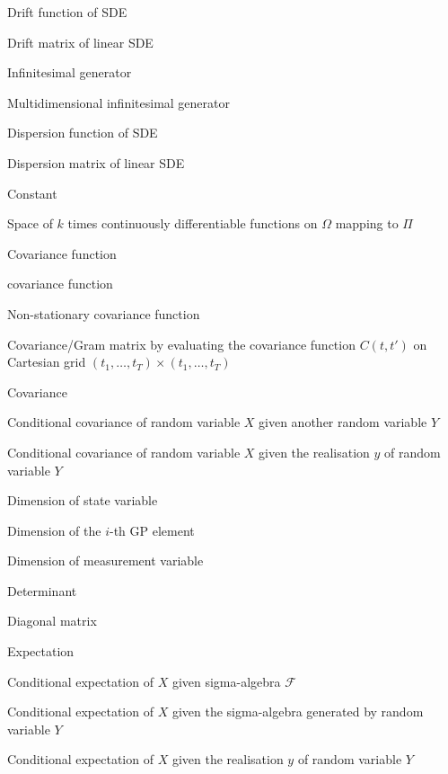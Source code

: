 \symbols

\begin{description}[style=multiline,leftmargin=3cm]
\item[$a$] Drift function of SDE
\item[$A$] Drift matrix of linear SDE
\item[$\A$] Infinitesimal generator
\item[$\Am$] Multidimensional infinitesimal generator
\item[$b$] Dispersion function of SDE
\item[$B$] Dispersion matrix of linear SDE
\item[$c$] Constant
\item[$\mathcal{C}^k(\Omega; \Pi)$] Space of $k$ times continuously differentiable functions on $\Omega$ mapping to $\Pi$
\item[$C(t,t')$] Covariance function
\item[$C_{\mathrm{Mat.}}(t,t')$] \matern covariance function
\item[$C_{\mathrm{NS}}(t,t')$] Non-stationary \matern covariance function
\item[$C_{1:T}$] Covariance/Gram matrix by evaluating the covariance function $C(t, t')$ on Cartesian grid $(t_1,\ldots, t_T) \times (t_1,\ldots, t_T)$
\item[$\covsym$] Covariance
\item[$\cov{X \mid Y}$] Conditional covariance of random variable $X$ given another random variable $Y$
\item[$\cov{X \mid y}$] Conditional covariance of random variable $X$ given the realisation $y$ of random variable $Y$
\item[$d$] Dimension of state variable
\item[$d_i$] Dimension of the $i$-th GP element
\item[$d_y$] Dimension of measurement variable
\item[$\det$] Determinant
\item[$\diagsym$] Diagonal matrix 
\item[$\expecsym$] Expectation
\item[$\expec{X \mid \mathcal{F}}$] Conditional expectation of $X$ given sigma-algebra $\mathcal{F}$
\item[$\expec{X \cond Y}$] Conditional expectation of $X$ given the sigma-algebra generated by random variable $Y$
\item[$\expec{X \cond y}$] Conditional expectation of $X$ given the realisation $y$ of random variable $Y$

\end{description}
